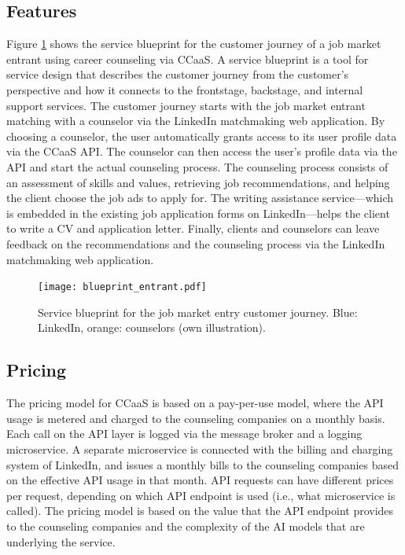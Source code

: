 \subsection{Features}

Figure \ref{fig:blueprint_entrant} shows the service blueprint for the customer journey of a job
market entrant using career counseling via CCaaS. A service blueprint is a tool for service design
that describes the customer journey from the customer's perspective and how it connects to the 
frontstage, backstage, and internal support services. The customer journey starts with the job market
entrant matching with a counselor via the LinkedIn matchmaking web application. By choosing a counselor,
the user automatically grants access to its user profile data via the CCaaS API. The counselor can
then access the user's profile data via the API and start the actual counseling process. The counseling
process consists of an assessment of skills and values, retrieving job recommendations, and helping
the client choose the job ads to apply for. The writing assistance service---which is embedded in the 
existing job application forms on LinkedIn---helps the client to write a CV and application letter.
Finally, clients and counselors can leave feedback on the recommendations and the counseling process
via the LinkedIn matchmaking web application.

\begin{figure}
    \centering
    \caption{Service blueprint for the job market entry customer journey. Blue: LinkedIn, orange: counselors (own illustration).}
    \label{fig:blueprint_entrant}
    \texttt{[image: blueprint\_entrant.pdf]}
\end{figure}



\subsection{Pricing}

The pricing model for CCaaS is based on a pay-per-use model, where the API usage is metered and
charged to the counseling companies on a monthly basis. Each call on the API layer is logged via
the message broker and a logging microservice. A separate microservice is connected with the billing
and charging system of LinkedIn, and issues a monthly bills to the counseling companies based on
the effective API usage in that month. API requests can have different prices per request, depending
on which API endpoint is used (i.e., what microservice is called). The pricing model is based on
the value that the API endpoint provides to the counseling companies and the complexity of the 
AI models that are underlying the service. 


